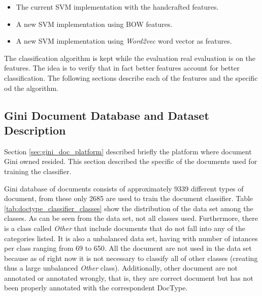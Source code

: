 \begin{itemize}
\item The current \ac{SVM} implementation with the handcrafted features.
\item A new \ac{SVM} implementation using \ac{BOW} features.
\item A new \ac{SVM} implementation using \textit{Word2vec} word vector as features.
\end{itemize}

The classification algorithm is kept while the
evaluation real evaluation is on the features. The idea  is to verify
that in fact better features account for better classification. The following
sections describe each of the features and the specific od the algorithm. 


\subsection{Gini Document Database and Dataset Description}
\label{sec:gini_db_dataset_desc}
  
Section \ref{sec:gini_doc_platform} described briefly the platform where
document Gini owned resided. This section described the specific of the
documents used for training the classifier. 

Gini database of documents consists of approximately 9339 different types of
document, from these only 2685 are used to train the document classifier.
Table \ref{tab:doctype_classifier_classes} show the distribution of the data
set among the classes. As can be seen from the data set, not all classes
used. Furthermore, there is a class called \textit{Other} that include
documents that do not fall into any of the categories listed. It is also a
unbalanced data set, having with number of intances per class ranging from 69
to 650. All the document are not used in the data set because as of right now
it is not necessary to classify all of other classes (creating thus a large
unbalanced \textit{Other} class). Additionally, other document are not
annotated or annotated wrongly, that is, they are correct document but has
not been properly annotated with the correspondent \ac{DocType}.


